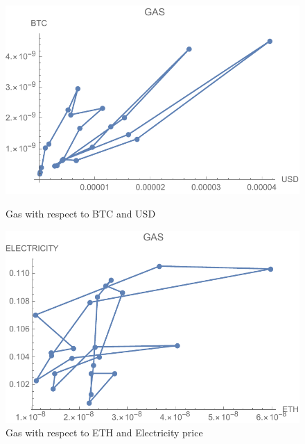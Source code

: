 \begin{figure}[!htb]
	\includegraphics[width=\linewidth]{figures/gas.pdf}
	\caption{Gas with respect to BTC and USD}\label{fig:gas}
	\endminipage\hfill
	\includegraphics[width=\linewidth]{figures/gasElectricity.pdf}
	\caption{Gas with respect to ETH and Electricity price}\label{fig:gasElectricity}
	\endminipage\hfill
\end{figure}

